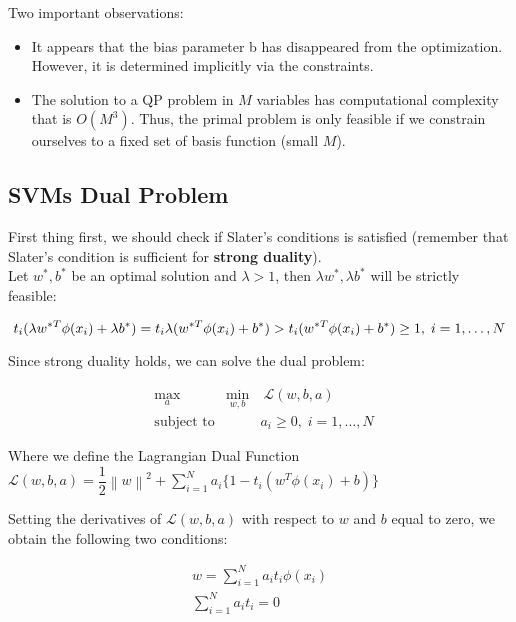 \documentclass[twoside]{article}
\newcommand{\norm}[1]{\left\lVert #1 \right\rVert}
\begin{document}
Two important observations:
\begin{itemize}
    \item It appears that the bias parameter b has disappeared from the optimization. However, it is determined implicitly via the constraints.
    \item The solution to a QP problem in $M$ variables has computational complexity that is $O(M^3)$. Thus, the primal problem is only feasible if we constrain ourselves to a fixed set of basis function (small $M$).  
\end{itemize}

\newpage

\subsection{SVMs Dual Problem}

First thing first, we should check if Slater's conditions is satisfied (remember that Slater's condition is sufficient for \textbf{strong duality}).\\
Let $w^*,b^*$ be an optimal solution and $\lambda > 1$, then $\lambda w^*, \lambda b^*$ will be strictly feasible:

\begin{equation*}
    t_{i}(\lambda w^{*T} \phi(x_{i}) + \lambda b^*) =  t_{i} \lambda ( w^{*T} \phi(x_{i}) +  b^*) > t_{i}  ( w^{*T} \phi(x_{i}) +  b^*) \geq 1, \; i = 1, \ldots, N \\
\end{equation*}

Since strong duality holds, we can solve the dual problem:

\begin{equation*}
\begin{aligned}
& \underset{a}{\text{max}}
&  \underset{w,b}{\text{min}}
& \ \mathcal{L}(w,b,a) \\
& \text{subject to}
& & a_{i} \geq 0, \; i = 1, \ldots, N \
\end{aligned}
\end{equation*}

Where we define the Lagrangian Dual Function $\mathcal{L}(w,b,a) = \dfrac{1}{2} \norm{w}^2 + \sum_{i=1}^{N} a_i\{ 1- t_{i}(w^T \phi(x_{i}) +b) \} $

Setting the derivatives of $\mathcal{L}(w,b,a)$ with respect to $w$ and $b$ equal to zero, we obtain the following two conditions:

\begin{align}
       w = \sum_{i=1}^{N} a_{i}t_{i}\phi(x_{i})  \\        
    \sum_{i=1}^{N} a_{i}t_{i} = 0
\end{align}
\end{document}
